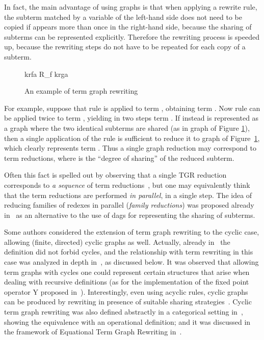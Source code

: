 \documentclass{eptcs}
\theoremstyle{plain}
\theoremstyle{definition}
\begin{document}
In fact, the  main advantage of using graphs is that when applying a rewrite
rule, the subterm matched by a variable  of the left-hand side does
not need to be copied if  appears more than once in the right-hand
side, because the sharing of subterms can be represented
explicitly. Therefore the
rewriting process is speeded up, because the rewriting steps do not
have to be repeated for each copy of a subterm.

\begin{figure}[b]
\centering
krfa
\hspace{1cm}
R_f
\hspace{1cm}
krga
\caption[ ]{An example of term graph rewriting}
\label{fi:term-graph-1}
\end{figure}

For example, suppose that rule  is applied
to term , obtaining term . Now 
rule  can be applied twice to term
, yielding in two steps term . If instead  is represented as a graph where the
two identical subterms are shared (as in graph  of Figure 
\ref{fi:term-graph-1}), then a single application of the rule is 
sufficient to
reduce it to graph  of Figure~\ref{fi:term-graph-1},  which 
clearly
represents term . Thus a single graph reduction may
correspond to  term reductions, where  is the ``degree of
sharing'' of the reduced subterm.
  

Often this fact is spelled out by observing that a single TGR
reduction corresponds to \emph{a sequence} of  term reductions~\cite{BEGKPS:TGR,HP:ITRJ}, but one may equivalently think 
that the  term reductions are performed \emph{in parallel}, in a
single step. The idea of reducing families of redexes in
parallel (\emph{family reductions}) was proposed already in~\cite{DBLP:journals/jcss/Vuillemin74,DBLP:journals/jacm/BerryL79} as
an alternative to the use of dags for representing the sharing of subterms.


Some authors considered the extension of term
graph rewriting to the cyclic case, allowing (finite, directed)
cyclic graphs as well. Actually, already in~\cite{BEGKPS:TGR} the
definition did not forbid cycles, and the relationship with 
term rewriting in this case was analyzed in depth
in~\cite{KKSV:AGRS}, as discussed below. It was observed that
allowing term graphs with cycles one could represent certain
structures that arise when dealing with recursive definitions (as for
the implementation of the fixed point operator {\sf Y} proposed
in~\cite{DBLP:journals/spe/Turner79}). Interestingly, even using
acyclic rules, cyclic graphs can be produced by rewriting in
presence of suitable sharing strategies~\cite{FRW:CPCR,FW:RCTG}.
Cyclic term graph rewriting was also defined abstractly in a
categorical setting in~\cite{CG:RCSE}, showing the equivalence with an
operational definition; and it was discussed in the framework of
Equational Term Graph Rewriting in~\cite{DBLP:journals/fuin/AriolaK96}.
\end{document}
